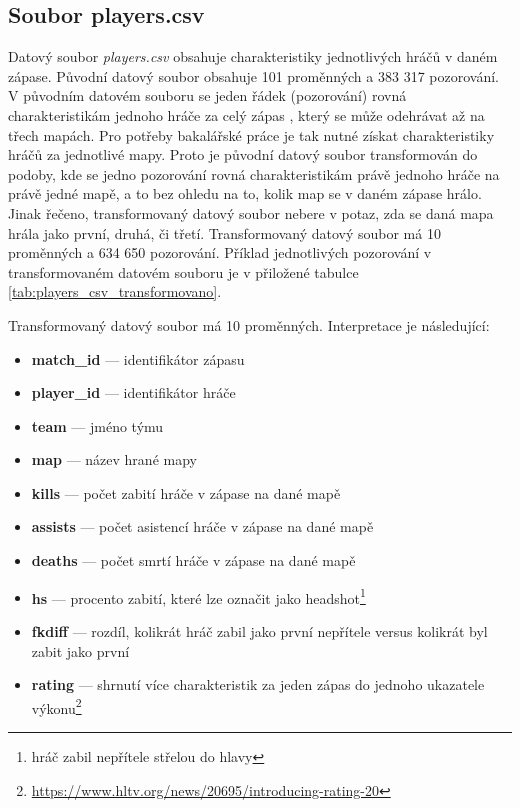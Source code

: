\subsection{Soubor players.csv}
{\color{red}
Datový soubor
}
\textit{players.csv} obsahuje 
{\color{red}
charakteristiky
}
jednotlivých hráčů v daném zápase. Původní datový soubor obsahuje 101 proměnných a 383 317 pozorování.
V původním datovém souboru se jeden řádek (pozorování) rovná charakteristikám jednoho hráče za celý zápas
{\color{red}
, který se může odehrávat až na třech mapách.
}
Pro potřeby bakalářské práce je tak nutné získat charakteristiky hráčů
za jednotlivé mapy. Proto je původní datový soubor transformován do podoby, kde se jedno pozorování rovná charakteristikám
právě jednoho hráče na právě jedné mapě, a to bez ohledu na to, kolik map se v daném zápase hrálo. Jinak řečeno, transformovaný datový soubor nebere v potaz, zda
se daná mapa hrála jako první, druhá, či třetí.
Transformovaný datový soubor má 10 proměnných a 634 650 pozorování. Příklad jednotlivých pozorování v transformovaném
datovém souboru je v přiložené tabulce \ref{tab:players_csv_transformovano}.

\newpage
Transformovaný 
{\color{red}
datový soubor
}
má 10 proměnných. Interpretace je následující:
\begin{itemize}
    \item \textbf{match\_id} --- identifikátor zápasu
    \item \textbf{player\_id} --- identifikátor hráče
    \item \textbf{team} --- jméno týmu
    \item \textbf{map} --- název hrané mapy
    \item \textbf{kills} --- počet zabití hráče v zápase na dané mapě
    \item \textbf{assists} --- počet asistencí hráče v zápase na dané mapě
    \item \textbf{deaths} --- počet smrtí hráče v zápase na dané mapě
    \item \textbf{hs} --- procento zabití, které lze označit jako headshot\footnote{hráč zabil nepřítele střelou do hlavy}
    \item \textbf{fkdiff} --- rozdíl, kolikrát hráč zabil jako první nepřítele versus kolikrát byl zabit jako první
    \item \textbf{rating} --- shrnutí více charakteristik za jeden zápas do jednoho ukazatele výkonu\footnote{\url{https://www.hltv.org/news/20695/introducing-rating-20}}
\end{itemize}

